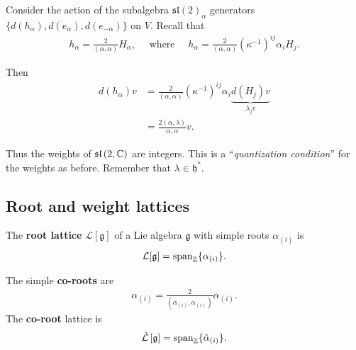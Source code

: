 Consider the action of the subalgebra $\mathfrak{sl}\left( 2 \right)_{\alpha}$ generators $\{d\left( h_\alpha \right) , d\left( e_\alpha \right) , d \left( e_{-\alpha} \right) \} $ on $V$. Recall that
\begin{align}
    h_\alpha = \frac{2}{\left( \alpha, \alpha \right) } H_\alpha,\quad \text{~where~}\quad
    h_{\alpha} = \frac{2}{\left( \alpha, \alpha \right) } \left( \kappa^{-1} \right)^{ij} \alpha_i H_j
.\end{align}

Then
\begin{align}
    d\left( h_\alpha \right) v &= \frac{2}{\left( \alpha, \alpha \right)} \left( \kappa^{-1} \right)^{ij} \alpha_i \underbrace{d\left( H_j \right) v}_{\lambda_j v} \\
    &= \frac{2 \left( \alpha, \lambda \right) }{\alpha, \alpha} v 
.\end{align}

Thus the weights of $\mathfrak{sl}\left( 2,\mathbb{C} \right) $ are integers. This is a ``\textit{quantization condition}'' for the weights as before. Remember that $\lambda \in \mathfrak{h}^{*}$.

\subsection{Root and weight lattices}

\begin{definition}
    The \textbf{root lattice} $\mathcal{L}\left[ \mathfrak{g} \right] $ of a Lie algebra $\mathfrak{g}$ with simple roots $\alpha_{\left( i \right) }$ is
    \begin{align}
        \mathcal{L}[\mathfrak{g}] = \text{span}_{\mathbb{Z}} \{\alpha_{\left( i \right) }\} 
    .\end{align}
\end{definition}

\begin{definition}
    The simple \textbf{co-roots} are
    \begin{align}
        \alpha_{\left( i \right) } = \frac{2}{\left( \alpha_{\left( i \right) }, \alpha_{\left( i \right) } \right) } \alpha_{\left( i \right) }
    .\end{align}
    The \textbf{co-root} lattice is
    \begin{align}
        \check{\mathcal{L}} \left[ \mathfrak{g} \right] = \text{span}_{\mathbb{Z}} \{\check{\alpha}_{\left( i \right) }\} 
    .\end{align}
\end{definition}


